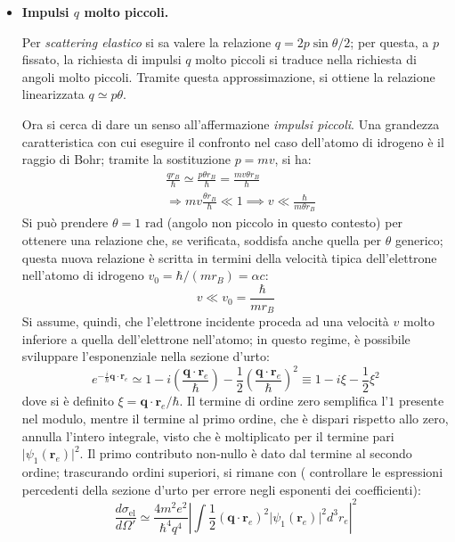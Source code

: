 \documentclass[11pt, a4paper]{scrartcl} %
\numberwithin{equation}{subsection}
\theoremstyle{style2}
\theoremstyle{style1}
\begin{document}
\begin{itemize}
	\item \textbf{Impulsi $q$ molto piccoli.} 

		Per \textit{scattering elastico} si sa valere la relazione $q = 2p \sin \theta  / 2$; per questa, a $p$ fissato, la richiesta di impulsi $q $ molto piccoli si traduce nella richiesta di angoli molto piccoli. 
		Tramite questa approssimazione, si ottiene la relazione linearizzata $q \simeq p \theta $.

		Ora si cerca di dare un senso all'affermazione \textit{impulsi piccoli}.
Una grandezza caratteristica con cui eseguire il confronto nel caso dell'atomo di idrogeno \`e il raggio di Bohr; tramite la sostituzione $p = mv$, si ha:
\[
\begin{split}
	&\frac{qr_B}{\hbar } \simeq \frac{p \theta  r_B}{\hbar } = \frac{mv \theta r_B}{\hbar }\\
	&\Rightarrow  mv \frac{\theta r_B}{\hbar }\ll 1 \implies v\ll \frac{\hbar }{m\theta r_B}
\end{split}
\] 
Si pu\`o prendere $\theta  = 1 \text{ rad}$ (angolo non piccolo in questo contesto) per ottenere una relazione che, se verificata, soddisfa anche quella per $\theta $ generico; questa nuova relazione \`e scritta in termini della velocit\`a tipica dell'elettrone nell'atomo di idrogeno $v_0 = \hbar  / (mr_B) = \alpha  c$:
\begin{equation}
	v\ll v_0 = \frac{\hbar }{mr_B}
\end{equation}
Si assume, quindi, che l'elettrone incidente proceda ad una velocit\`a $v$ molto inferiore a quella dell'elettrone nell'atomo; in questo regime, \`e possibile sviluppare l'esponenziale nella sezione d'urto:
\[
e^{-\frac{i}{\hbar } \mathbf{q} \cdot \mathbf{r}_e } \simeq 1 - i \left(\frac{\mathbf{q} \cdot \mathbf{r} _e}{\hbar }\right) - \frac{1}{2} \left(\frac{\mathbf{q} \cdot \mathbf{r}_e }{\hbar }\right) ^2 \equiv 1- i \xi  - \frac{1}{2}\xi ^2 
\] 
dove si \`e definito $\xi  = \mathbf{q}  \cdot \mathbf{r}_e / \hbar $.
Il termine di ordine zero semplifica l'$1$ presente nel modulo, mentre il termine al primo ordine, che \`e dispari rispetto allo zero, annulla l'intero integrale, visto che \`e moltiplicato per il termine pari $\lvert \psi _1(\mathbf{r} _e) \rvert ^2$.
Il primo contributo non-nullo \`e dato dal termine al secondo ordine; trascurando ordini superiori, si rimane con ({\color{red} controllare le espressioni percedenti della sezione d'urto per errore negli esponenti dei coefficienti}):
\[
\frac{d \sigma _\text{el}}{d \Omega '} \simeq \frac{4m^2 e^2}{\hbar ^4 q^4} \left\lvert \int \frac{1}{2} (\mathbf{q} \cdot \mathbf{r} _e)^2 \lvert \psi _1(\mathbf{r} _e) \rvert ^2 d^3 r_e \right\rvert ^2
\]
\end{itemize}
\end{document}
